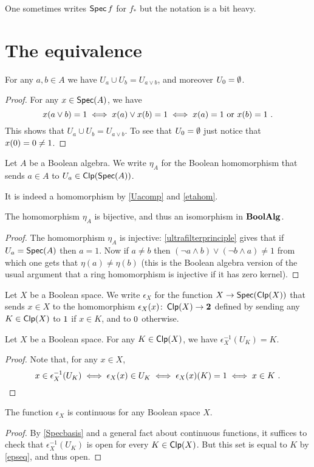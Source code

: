 \documentclass[a4paper]{article}
\begin{document}
One sometimes writes $\operatorname*{\mathsf{Spec}} f$ for $f_*$ but
the notation is a bit heavy.

\section{The equivalence}
\begin{lemma}\label{etahom}
    For any $a, b \in A$ we have $U_a \cup U_b = U_{a \vee b}$, and moreover
    $U_{0} = \emptyset$.
\end{lemma}
\begin{proof}
    For any $x \in \operatorname*{\mathsf{Spec}}(A)$, we have 
    \[ x(a \vee b)= 1 \iff x(a) \vee x(b) = 1 \iff x(a) = 1 \text{ or
    } x(b) = 1 \ . \]
    This shows that $U_a \cup U_b = U_{a \vee b}$. To see that $U_{0} =
    \emptyset$ just notice that $x(0) = 0 \neq 1$.
\end{proof}
\begin{definition}
Let $A$ be a Boolean algebra. We write $\eta_A$ for the Boolean homomorphism
that sends $a \in A$ to $U_a \in \operatorname*{\mathsf{Clp}}(\operatorname*{\mathsf{Spec}}(A))$.
\end{definition}
It is indeed a homomorphism by \cref{Uacomp} and \cref{etahom}.
\begin{proposition}
The homomorphism $\eta_A$ is bijective, and thus an isomorphism in $\mathbf{BoolAlg}$.
\end{proposition}
\begin{proof}
    The homomorphism $\eta_A$ is injective: 
    \cref{ultrafilterprinciple} gives that if $U_a = \operatorname*{\mathsf{Spec}}(A)$ then 
    $a = 1$. Now if $a \neq b$ then $(\neg a \wedge b) \vee (\neg b \wedge a)
    \neq 1$ from which one gets that $\eta(a) \neq \eta(b)$ (this is the
    Boolean algebra version of the usual argument that a ring homomorphism is
    injective if it has zero kernel). 
\end{proof}

\begin{definition}
    Let $X$ be a Boolean space. We write $\epsilon_X$ for the 
    function $X \to \operatorname*{\mathsf{Spec}} (\operatorname*{\mathsf{Clp}}(X))$ that sends $x \in X$ to the homomorphism
    $\epsilon_X(x) \colon \operatorname*{\mathsf{Clp}}(X) \to \mathbf{2}$ defined by sending any $K \in \operatorname*{\mathsf{Clp}}(X)$ to $1$ if $x \in K$,
    and to $0$ otherwise.
\end{definition}
\begin{lemma}\label{epseq}
    Let $X$ be a Boolean space. For any $K \in \operatorname*{\mathsf{Clp}}(X)$, we have
    $\epsilon_X^{-1}(U_K) = K$.
\end{lemma}
\begin{proof}
    Note that, for any $x \in X$,
    \[ x \in \epsilon_X^{-1}(U_K) \iff \epsilon_X(x) \in U_K \iff
    \epsilon_X(x)(K) = 1 \iff x \in K \ . \qedhere \] 
\end{proof}
\begin{proposition}
    The function $\epsilon_X$ is continuous for any Boolean space $X$.
\end{proposition}
\begin{proof}
    By \cref{Specbasis} and a general fact about continuous functions, it
    suffices to check that $\epsilon_X^{-1}(U_K)$ is open for every $K \in
    \operatorname*{\mathsf{Clp}}(X)$.  But this set is equal to $K$ by \cref{epseq}, and thus open.
\end{proof}
\end{document}

